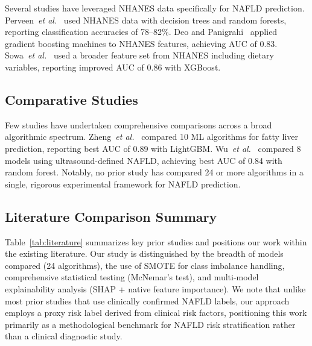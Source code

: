\documentclass[conference,10pt]{IEEEtran}
\newcommand{\etal}{\textit{et al.}}
\begin{document}
Several studies have leveraged NHANES data specifically for NAFLD prediction. Perveen~\etal{}~\cite{perveen2018metabolic} used NHANES data with decision trees and random forests, reporting classification accuracies of 78--82\%. Deo and Panigrahi~\cite{deo2019machine} applied gradient boosting machines to NHANES features, achieving AUC of 0.83. Sowa~\etal{}~\cite{sowa2021machine} used a broader feature set from NHANES including dietary variables, reporting improved AUC of 0.86 with XGBoost.

\subsection{Comparative Studies}

Few studies have undertaken comprehensive comparisons across a broad algorithmic spectrum. Zheng~\etal{}~\cite{zheng2022machine} compared 10 ML algorithms for fatty liver prediction, reporting best AUC of 0.89 with LightGBM. Wu~\etal{}~\cite{wu2023comprehensive} compared 8 models using ultrasound-defined NAFLD, achieving best AUC of 0.84 with random forest. Notably, no prior study has compared 24 or more algorithms in a single, rigorous experimental framework for NAFLD prediction.

\subsection{Literature Comparison Summary}

Table~\ref{tab:literature} summarizes key prior studies and positions our work within the existing literature. Our study is distinguished by the breadth of models compared (24 algorithms), the use of SMOTE for class imbalance handling, comprehensive statistical testing (McNemar's test), and multi-model explainability analysis (SHAP + native feature importance). We note that unlike most prior studies that use clinically confirmed NAFLD labels, our approach employs a proxy risk label derived from clinical risk factors, positioning this work primarily as a methodological benchmark for NAFLD risk stratification rather than a clinical diagnostic study.
\end{document}
